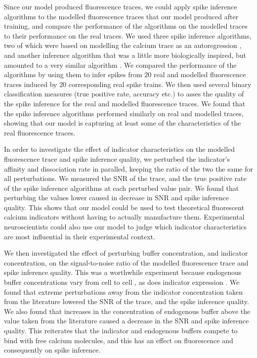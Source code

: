 Since our model produced fluorescence traces, we could apply spike inference algorithms to the modelled fluorescence traces that our model produced after training, and compare the performance of the algorithms on the modelled traces to their performance on the real traces. We used three spike inference algorithms, two of which were based on modelling the calcium trace as an autoregression \parencite{friedrich, pnevmatikakis}, and another inference algorithm that was a little more biologically inspired, but amounted to a very similar algorithm \parencite{deneux}. We compared the performance of the algorithms by using them to infer spikes from $20$ real and modelled fluorescence traces induced by $20$ corresponding real spike trains. We then used several binary classification measures (true positive rate, accuracy etc.) to asses the quality of the spike inference for the real and modelled fluorescence traces. We found that the spike inference algorithms performed similarly on real and modelled traces, showing that our model is capturing at least some of the characteristics of the real fluorescence traces.

In order to investigate the effect of indicator characteristics on the modelled fluorescence trace and spike inference quality, we perturbed the indicator's affinity and dissociation rate in paralled, keeping the ratio of the two the same for all perturbations. We measured the SNR of the trace, and the true positive rate of the spike inference algorithms at each perturbed value pair. We found that perturbing the values lower caused in decrease in SNR and spike inference quality. This shows that our model could be used to test theoretical fluorescent calcium indicators without having to actually manufacture them. Experimental neuroscientists could also use our model to judge which indicator characteristics are most influential in their experimental context.

We then investigated the effect of perturbing buffer concentration, and indicator concentration, on the signal-to-noise ratio of the modelled fluorescence trace and spike inference quality. This was a worthwhile experiment because endogenous buffer concentrations vary from cell to cell \parencite{bartol, maravall, neher}, as does indicator expression \parencite{chen}. We found that extreme perturbations away from the indicator concentration taken from the literature lowered the SNR of the trace, and the spike inference quality. We also found that increases in the concentration of endogenous buffer above the value taken from the literature caused a decrease in the SNR and spike inference quality. This reiterates that the indicator and endogenous buffers compete to bind with free calcium molecules, and this has an effect on fluorescence and consequently on spike inference.

